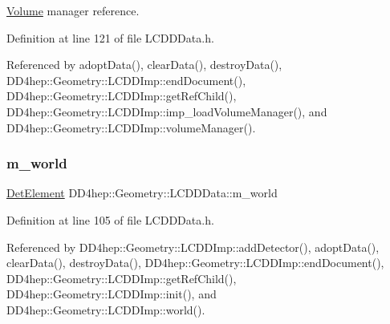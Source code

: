 \hyperlink{class_d_d4hep_1_1_geometry_1_1_volume}{Volume} manager reference. 



Definition at line 121 of file L\+C\+D\+D\+Data.\+h.



Referenced by adopt\+Data(), clear\+Data(), destroy\+Data(), D\+D4hep\+::\+Geometry\+::\+L\+C\+D\+D\+Imp\+::end\+Document(), D\+D4hep\+::\+Geometry\+::\+L\+C\+D\+D\+Imp\+::get\+Ref\+Child(), D\+D4hep\+::\+Geometry\+::\+L\+C\+D\+D\+Imp\+::imp\+\_\+load\+Volume\+Manager(), and D\+D4hep\+::\+Geometry\+::\+L\+C\+D\+D\+Imp\+::volume\+Manager().

\hypertarget{class_d_d4hep_1_1_geometry_1_1_l_c_d_d_data_a3ef048ff40cb10d7321edb4e128319c4}{}\label{class_d_d4hep_1_1_geometry_1_1_l_c_d_d_data_a3ef048ff40cb10d7321edb4e128319c4} 
\subsubsection{\texorpdfstring{m\+\_\+world}{m\_world}}
{\footnotesize\ttfamily \hyperlink{class_d_d4hep_1_1_geometry_1_1_det_element}{Det\+Element} D\+D4hep\+::\+Geometry\+::\+L\+C\+D\+D\+Data\+::m\+\_\+world\hspace{0.3cm}{\ttfamily [protected]}}



Definition at line 105 of file L\+C\+D\+D\+Data.\+h.



Referenced by D\+D4hep\+::\+Geometry\+::\+L\+C\+D\+D\+Imp\+::add\+Detector(), adopt\+Data(), clear\+Data(), destroy\+Data(), D\+D4hep\+::\+Geometry\+::\+L\+C\+D\+D\+Imp\+::end\+Document(), D\+D4hep\+::\+Geometry\+::\+L\+C\+D\+D\+Imp\+::get\+Ref\+Child(), D\+D4hep\+::\+Geometry\+::\+L\+C\+D\+D\+Imp\+::init(), and D\+D4hep\+::\+Geometry\+::\+L\+C\+D\+D\+Imp\+::world().

\hypertarget{class_d_d4hep_1_1_geometry_1_1_l_c_d_d_data_a42d6d627a9a04c95cda9bff9ef760abe}{}\label{class_d_d4hep_1_1_geometry_1_1_l_c_d_d_data_a42d6d627a9a04c95cda9bff9ef760abe} 
